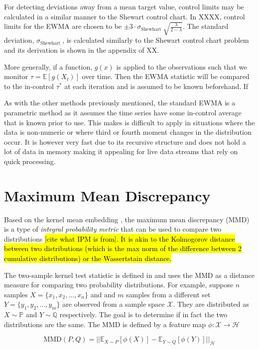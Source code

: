 For detecting deviations away from a mean target value, control limits may be calculated in a similar manner to the Shewart control chart. In XXXX, control limits for the EWMA are chosen to be  $\pm 3 \cdot \sigma_{\text {Shewhart }} \sqrt{\frac{\lambda}{2-\lambda}}$. The standard deviation, $\sigma_{\text {Shewhart }}$, is calculated similarly to the Shewart control chart problem and its derivation is shown in the appendix of XX.

More generally, if a function, $g(x)$ is applied to the observations such that we monitor $\tau= \mathbb{E}[g(X_t)]$ over time. Then the EWMA statistic will be compared to the in-control $\tau^*$ at each iteration and is assumed to be known beforehand. If 

As with the other methods previously mentioned, the standard EWMA is a parametric method as it assumes the time series have some in-control average that is known prior to use. This makes is difficult to apply in situations where the data is non-numeric or where third or fourth moment changes in the distribution occur. It is however very fast due to its recursive structure and does not hold a lot of data in memory making it appealing for live data streams that rely on quick processing.

\section{Maximum Mean Discrepancy}
Based on the kernel mean embedding , the maximum mean discrepancy (MMD) is a type of \textit{integral probability metric} that can be used to compare two distributions \hl{[cite what IPM is from]. It is akin to the Kolmogorov distance between two distributions (which is the max norm of the difference between 2 cumulative distributions) or the Wassertstain distance.}

The two-sample kernel test statistic is defined in \cite{gretton2012kernel} and uses the MMD as a distance measure for comparing two probability distributions. For example, suppose $n$ samples $X = \{x_1, x_2, ..., x_n\}$ and and $m$ samples from a different set $Y=\{y_1, y_2, ..., y_m\}$ are observed from a sample space $\mathcal{X}$. They are distributed as $X \sim  \mathbb{P}$ and $Y \sim \mathbb{Q}$ respectively. The goal is to determine if in fact the two distributions are the same. The MMD is defined by a feature map $\phi: \mathcal{X} \rightarrow \mathcal{H}$

$$\text{MMD}(P,Q)=|| \mathbb{E}_{X \sim P}[\phi(X)] -  \mathbb{E}_{Y \sim Q}[\phi(Y)]||_\mathcal{H}$$

